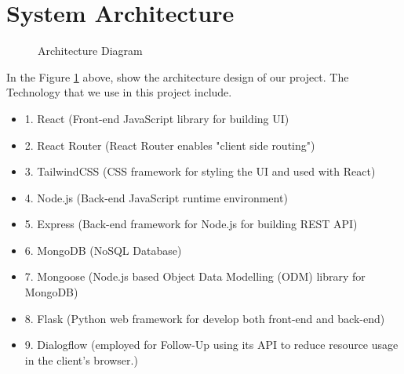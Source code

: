 \documentclass[12pt,oneside,openright,a4paper]{cpe-english-project}
\begin{document}
  \section{System Architecture}
  \begin{figure}[!h]
    \centering
    \caption{Architecture Diagram}\label{fig:System_Architecture}
  \end{figure}
  \qquad In the Figure \ref{fig:System_Architecture} above, show the architecture design of our project. The Technology that we use in this project include. \par
  \begin{itemize}
    \item[] 1. React (Front-end JavaScript library for building UI)
    \item[] 2. React Router (React Router enables "client side routing")
    \item[] 3. TailwindCSS (CSS framework for styling the UI and used with React)
    \item[] 4. Node.js (Back-end JavaScript runtime environment)
    \item[] 5. Express (Back-end framework for Node.js for building REST API)
    \item[] 6. MongoDB (NoSQL Database)
    \item[] 7. Mongoose (Node.js based Object Data Modelling (ODM) library for MongoDB)
    \item[] 8. Flask (Python web framework for develop both front-end and back-end)
    \item[] 9. Dialogflow (employed for Follow-Up using its API to reduce resource usage in the client’s browser.)
  \end{itemize}
\end{document}
